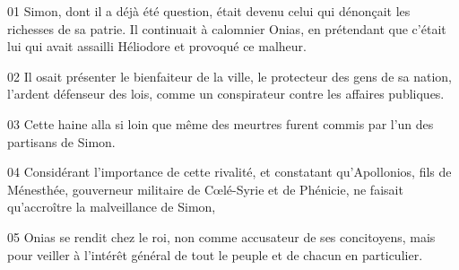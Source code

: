 01 Simon, dont il a déjà été question, était devenu celui qui dénonçait les richesses de sa patrie. Il continuait à calomnier Onias, en prétendant que c’était lui qui avait assailli Héliodore et provoqué ce malheur.

02 Il osait présenter le bienfaiteur de la ville, le protecteur des gens de sa nation, l’ardent défenseur des lois, comme un conspirateur contre les affaires publiques.

03 Cette haine alla si loin que même des meurtres furent commis par l’un des partisans de Simon.

04 Considérant l’importance de cette rivalité, et constatant qu’Apollonios, fils de Ménesthée, gouverneur militaire de Cœlé-Syrie et de Phénicie, ne faisait qu’accroître la malveillance de Simon,

05 Onias se rendit chez le roi, non comme accusateur de ses concitoyens, mais pour veiller à l’intérêt général de tout le peuple et de chacun en particulier.
